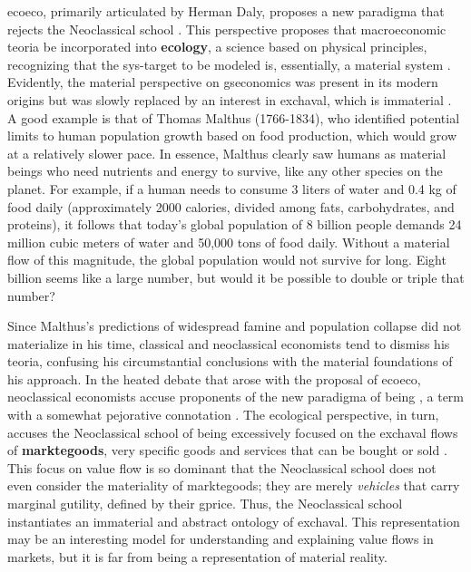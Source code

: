\documentclass[./main_en.tex]{subfiles}
\begin{document}
\par \gls{ecoeco}, primarily articulated by Herman Daly, proposes a new \gls{paradigma} that rejects the Neoclassical school \cite{daly2011}. This perspective proposes that macroeconomic \gls{teoria} be incorporated into \textbf{\gls{ecology}}, a science based on physical principles, recognizing that the \gls{sys-target} to be modeled is, essentially, a material \gls{system} \cite{Daly1968a}. Evidently, the material perspective on \gls{gseconomics} was present in its modern origins but was slowly replaced by an interest in \gls{exchaval}, which is immaterial \cite{Christensen1987}. A good example is that of Thomas Malthus (1766-1834), who identified potential limits to human population growth based on food production, which would grow at a relatively slower pace. In essence, Malthus clearly saw humans as material beings who need nutrients and energy to survive, like any other species on the planet. For example, if a human needs to consume 3 liters of water and 0.4 kg of food daily (approximately 2000 calories, divided among fats, carbohydrates, and proteins), it follows that today’s global population of 8 billion people demands 24 million cubic meters of water and 50,000 tons of food daily. Without a material flow of this magnitude, the global population would not survive for long. Eight billion seems like a large number, but would it be possible to double or triple that number?

\par Since Malthus's predictions of widespread famine and population collapse did not materialize in his time, classical and neoclassical economists tend to dismiss his \gls{teoria}, confusing his circumstantial conclusions with the material foundations of his approach. In the heated debate that arose with the proposal of \gls{ecoeco}, neoclassical economists accuse proponents of the new \gls{paradigma} of being , a term with a somewhat pejorative connotation \cite{Forrester1974}. The ecological perspective, in turn, accuses the Neoclassical school of being excessively focused on the \gls{exchaval} flows of \textbf{\gls{marktegoods}}, very specific goods and services that can be bought or sold \cite{Daly1997a, Daly1997b}. This focus on value flow is so dominant that the Neoclassical school does not even consider the materiality of \gls{marktegoods}; they are merely \textit{vehicles} that carry marginal \gls{gutility}, defined by their \gls{gprice}. Thus, the Neoclassical school instantiates an immaterial and abstract ontology of \gls{exchaval}. This representation may be an interesting \gls{model} for understanding and explaining value flows in markets, but it is far from being a representation of material reality.
\end{document}
